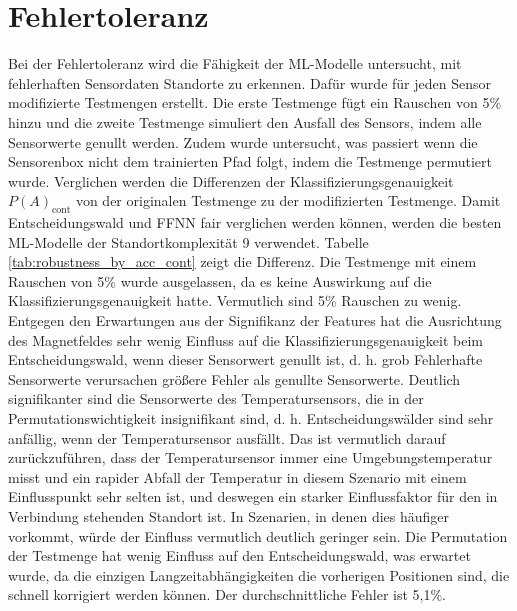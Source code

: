 \section{Fehlertoleranz}
Bei der Fehlertoleranz wird die Fähigkeit der ML-Modelle untersucht, mit fehlerhaften Sensordaten Standorte zu erkennen.
Dafür wurde für jeden Sensor modifizierte Testmengen erstellt.
Die erste Testmenge fügt ein Rauschen von 5\% hinzu und die zweite Testmenge simuliert den Ausfall des Sensors, indem alle Sensorwerte genullt werden.
Zudem wurde untersucht, was passiert wenn die Sensorenbox nicht dem trainierten Pfad folgt, indem die Testmenge permutiert wurde.
Verglichen werden die Differenzen der Klassifizierungsgenauigkeit $P(A)_{\text{cont}}$ von der originalen Testmenge zu der modifizierten Testmenge.
Damit Entscheidungswald und FFNN fair verglichen werden können, werden die besten ML-Modelle der Standortkomplexität 9 verwendet.
\newline
\newline
Tabelle \ref{tab:robustness_by_acc_cont} zeigt die Differenz.
Die Testmenge mit einem Rauschen von 5\% wurde ausgelassen, da es keine Auswirkung auf die Klassifizierungsgenauigkeit hatte.
Vermutlich sind 5\% Rauschen zu wenig.
Entgegen den Erwartungen aus der Signifikanz der Features hat die Ausrichtung des Magnetfeldes sehr wenig Einfluss auf die Klassifizierungsgenauigkeit beim Entscheidungswald,
wenn dieser Sensorwert genullt ist, d. h. grob Fehlerhafte Sensorwerte verursachen größere Fehler als genullte Sensorwerte.
Deutlich signifikanter sind die Sensorwerte des Temperatursensors, die in der Permutationswichtigkeit insignifikant sind,
d. h. Entscheidungswälder sind sehr anfällig, wenn der Temperatursensor ausfällt.
Das ist vermutlich darauf zurückzuführen, dass der Temperatursensor immer eine Umgebungstemperatur misst und
ein rapider Abfall der Temperatur in diesem Szenario mit einem Einflusspunkt sehr selten ist, und deswegen ein
starker Einflussfaktor für den in Verbindung stehenden Standort ist.
In Szenarien, in denen dies häufiger vorkommt, würde der Einfluss vermutlich deutlich geringer sein.
Die Permutation der Testmenge hat wenig Einfluss auf den Entscheidungswald, was erwartet wurde,
da die einzigen Langzeitabhängigkeiten die vorherigen Positionen sind, die schnell korrigiert werden können.
Der durchschnittliche Fehler ist 5,1\%.
